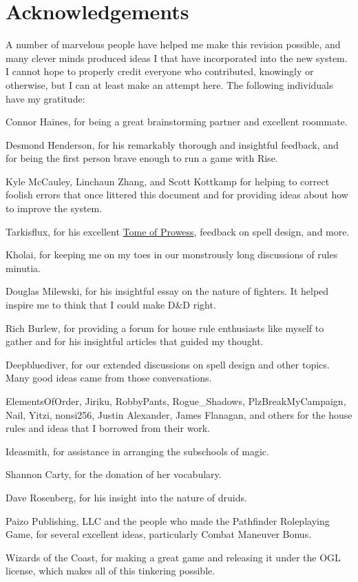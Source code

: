 \chapter*{Acknowledgements}
A number of marvelous people have helped me make this revision possible, and many clever minds produced ideas I that have incorporated into the new system. I cannot hope to properly credit everyone who contributed, knowingly or otherwise, but I can at least make an attempt here. The following individuals have my gratitude:

Connor Haines, for being a great brainstorming partner and excellent roommate.

Desmond Henderson, for his remarkably thorough and insightful feedback, and for being the first person brave enough to run a game with Rise.

Kyle McCauley, Linchaun Zhang, and Scott Kottkamp for helping to correct foolish errors that once littered this document and for providing ideas about how to improve the system.

Tarkisflux, for his excellent \href{http://dnd-wiki.org/wiki/Tome_of_Prowess_(3.5e_Sourcebook)}{Tome of Prowess}, feedback on spell design, and more.

Kholai, for keeping me on my toes in our monstrously long discussions of rules minutia.

Douglas Milewski, for his insightful essay on the nature of fighters. It helped inspire me to think that I could make D\&D right.

Rich Burlew, for providing a forum for house rule enthusiasts like myself to gather and for his insightful articles that guided my thought.

Deepbluediver, for our extended discussions on spell design and other topics. Many good ideas came from those conversations.

ElementsOfOrder, Jiriku, RobbyPants, Rogue\_Shadows, PlzBreakMyCampaign, Nail, Yitzi, nonsi256, Justin Alexander, James Flanagan, and others for the house rules and ideas that I borrowed from their work.

Ideasmith, for assistance in arranging the subschools of magic.

Shannon Carty, for the donation of her vocabulary.

Dave Rosenberg, for his insight into the nature of druids.

Paizo Publishing, LLC and the people who made the Pathfinder Roleplaying Game, for several excellent ideas, particularly Combat Maneuver Bonus.

Wizards of the Coast, for making a great game and releasing it under the OGL license, which makes all of this tinkering possible.

